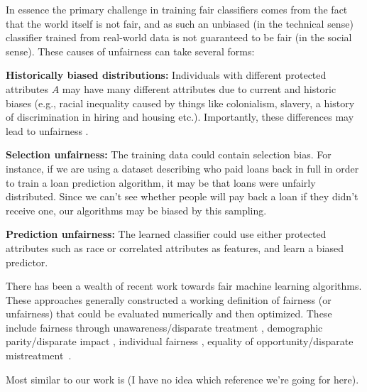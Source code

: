 In essence the primary challenge in training fair classifiers comes
from the fact that the world itself is not fair, and as such an
unbiased (in the technical sense) classifier trained from real-world
data is not guaranteed to be fair (in the social sense). These causes
of unfairness can take several forms:
\begin{description}
\item {\bf Historically biased distributions:} Individuals with different protected attributes $A$  may have many different attributes due to current and historic biases (e.g., racial inequality caused by things like colonialism,
slavery, a history of discrimination in hiring and
housing etc.). Importantly, these differences may lead to unfairness%
.
\item {\bf Selection unfairness:} The training data could contain selection bias. For instance, if we are using a dataset describing who paid loans back in full in order to train a loan prediction algorithm, it may be that loans were unfairly distributed. Since we can't see whether people will pay back a loan if they didn't receive one, our algorithms may be biased by this sampling.
\item {\bf Prediction unfairness:} The learned classifier could use either protected attributes such as race or correlated attributes as features, and  learn a biased predictor.
\end{description}
There has been a wealth of recent work towards fair machine learning
algorithms. %
These approaches generally constructed a working
definition of fairness (or unfairness) that could be evaluated numerically and  then
optimized. These include fairness through unawareness/disparate
treatment \cite{grgiccase,zafar2016fairness}, demographic
parity/disparate impact \cite{zafar2015learning}, individual fairness
\cite{dwork2012fairness,zemel2013learning,louizos2015variational,joseph2016rawlsian},
equality of opportunity/disparate
mistreatment~\cite{hardt2016equality,zafar2016fairness}.

Most similar to our work is \cite{zemel2013learning} (I have no idea which reference we're going for here).

